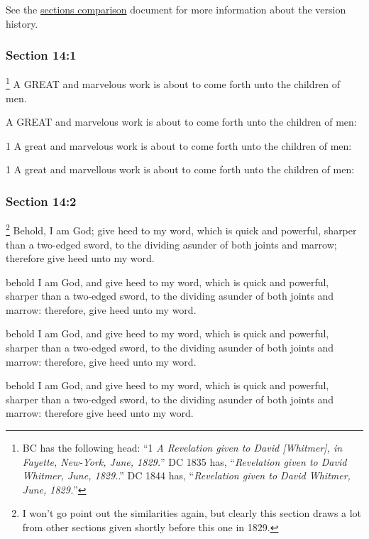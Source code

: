 		\medskip
		
		See the \href{https://drive.google.com/file/d/1goAvNz8jS4R8slYfMG_db55Ty2z_vmgK/view?usp=sharing}{sections comparison} document for more information about the version history.

	\subsubsection{Section 14:1} %
		\label{DC14-1}

		\footnote{%
			BC has the following head: ``1 \textit{A Revelation given to David [Whitmer], in Fayette, New-York, June, 1829.}'' DC 1835 has, ``\textit{Revelation given to David Whitmer, June, 1829.}.'' DC 1844 has, ``\textit{Revelation given to David Whitmer, June, 1829.}''
			}%
		A GREAT and marvelous work is about to come forth unto the children of men.

		\begin{framed}
		\scriptsize
			\begin{compactdesc}
				\item[JSP] A GREAT and marvelous work is about to come forth unto the children of men: 
				\item[DC 1835] 1 A great and marvelous work is about to come forth unto the children of men: 
				\item[DC 1844] 1 A great and marvellous work is about to come forth unto the children of men: 
			\end{compactdesc}
		\end{framed}

	\subsubsection{Section 14:2} %
		\label{DC14-2}

			\footnote{%
				I won't go point out the similarities again, but clearly this section draws a lot from other sections given shortly before this one in 1829.
				}%
		Behold, I am God; give heed to my word, which is quick and powerful, sharper than a two-edged sword, to the dividing asunder of both joints and marrow; therefore give heed unto my word.

		\begin{framed}
		\scriptsize
			\begin{compactdesc}
				\item[JSP] behold I am God, and give heed to my word, which is quick and powerful, sharper than a two-edged sword, to the dividing asunder of both joints and marrow: therefore, give heed unto my word.
				\item[DC 1835] behold I am God, and give heed to my word, which is quick and powerful, sharper than a two-edged sword, to the dividing asunder of both joints and marrow: therefore, give heed unto my word.
				\item[DC 1844] behold I am God, and give heed to my word, which is quick and powerful, sharper than a two-edged sword, to the dividing asunder of both joints and marrow: therefore give heed unto my word.
			\end{compactdesc}
		\end{framed}

